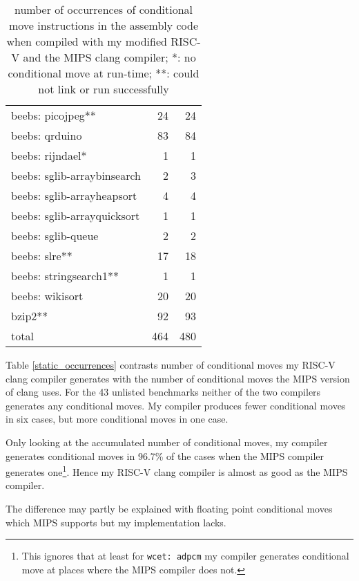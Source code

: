\documentclass[12pt,twoside,notitlepage]{report}
\begin{document}
\begin{table}
\begin{tabular}{lrr}
	beebs: picojpeg** & 24 & 24\\
	
	beebs: qrduino & 83 & 84\\
	
	beebs: rijndael* & 1 & 1\\
	
	beebs: sglib-arraybinsearch & 2 & 3\\
	
	beebs: sglib-arrayheapsort & 4 & 4\\
	
	beebs: sglib-arrayquicksort & 1 & 1\\
	
	beebs: sglib-queue & 2 & 2\\
	
	beebs: slre** & 17 & 18 \\
	
	beebs: stringsearch1** & 1 & 1\\
	
	beebs: wikisort & 20 & 20\\

	bzip2** & 92 & 93\\
\hline
	total & 464 & 480\\
\end{tabular}
\caption{number of occurrences of conditional move instructions in the assembly code when compiled with my modified RISC-V and the MIPS clang compiler; *: no conditional move at run-time; **: could not link or run successfully }
\end{table}

Table \ref{static_occurrences} contrasts number of conditional moves my RISC-V clang compiler generates with the number of conditional moves the MIPS version of clang uses. For the 43 unlisted benchmarks neither of the two compilers generates any conditional moves. My compiler produces fewer conditional moves in six cases, but more conditional moves in one case.

Only looking at the accumulated number of conditional moves, my compiler generates conditional moves in 96.7\% of the cases when the MIPS compiler generates one\footnote{This ignores that at least for \texttt{wcet: adpcm} my compiler generates conditional move at places where the MIPS compiler does not.}. Hence my RISC-V clang compiler is almost as good as the MIPS compiler.

The difference may partly be explained with floating point conditional moves which MIPS supports but my implementation lacks.
\end{document}
